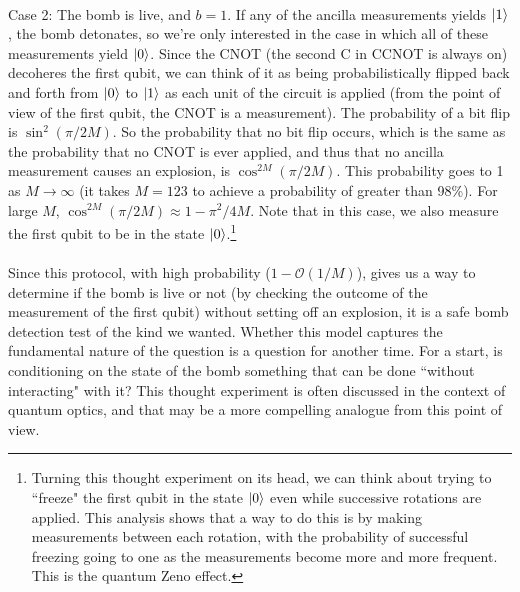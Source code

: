 \documentclass[]{article}
\theoremstyle{plain}
\theoremstyle{definition}
\theoremstyle{remark}
\begin{document}
\\
Case 2: The bomb is live, and $b=1$. If any of the ancilla measurements yields ${\left\vert{1}\right\rangle}$, the bomb detonates, so we're only interested in the case in which all of these measurements yield ${\left\vert{0}\right\rangle}$. Since the CNOT (the second C in CCNOT is always on) decoheres the first qubit, we can think of it as being probabilistically flipped back and forth from ${\left\vert{0}\right\rangle}$ to ${\left\vert{1}\right\rangle}$ as each unit of the circuit is applied (from the point of view of the first qubit, the CNOT is a measurement). The probability of a bit flip is $\sin^2(\pi/2M)$. So the probability that no bit flip occurs, which is the same as the probability that no CNOT is ever applied, and thus that no ancilla measurement causes an explosion, is $\cos^{2M}(\pi/2M)$. This probability goes to 1 as $M\rightarrow\infty$ (it takes $M=123$ to achieve a probability of greater than 98\%). For large $M$, $\cos^{2M}(\pi/2M)\approx 1-\pi^2/4M$. Note that in this case, we also measure the first qubit to be in the state ${\left\vert{0}\right\rangle}$.\footnote{Turning this thought experiment on its head, we can think about trying to ``freeze" the first qubit in the state ${\left\vert{0}\right\rangle}$ even while successive rotations are applied. This analysis shows that a way to do this is by making measurements between each rotation, with the probability of successful freezing going to one as the measurements become more and more frequent. This is the quantum Zeno effect.}\\
\\
Since this protocol, with high probability ($1-\mathcal{O}(1/M)$), gives us a way to determine if the bomb is live or not (by checking the outcome of the measurement of the first qubit) without setting off an explosion, it is a safe bomb detection test of the kind we wanted. Whether this model captures the fundamental nature of the question is a question for another time. For a start, is conditioning on the state of the bomb something that can be done ``without interacting" with it? This thought experiment is often discussed in the context of quantum optics, and that may be a more compelling analogue from this point of view.
\end{document}
